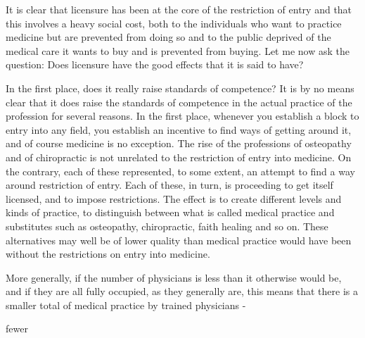 \documentclass[11pt,openany]{book}
\begin{document}
It is clear that licensure has been at the core of the restriction of entry and that this involves a heavy social cost, both to the individuals who want to practice medicine but are prevented from doing so and to the public deprived of the medical care it wants to buy and is prevented from buying. Let me now ask the question: Does licensure have the good effects that it is said to have?

In the first place, does it really raise standards of competence? It is by no means clear that it does raise the standards of competence in the actual practice of the profession for several reasons. In the first place, whenever you establish a block to entry into any field, you establish an incentive to find ways of getting around it, and of course medicine is no exception. The rise of the professions of osteopathy and of chiropractic is not unrelated to the restriction of entry into medicine. On the contrary, each of these represented, to some extent, an attempt to find a way around restriction of entry. Each of these, in turn, is proceeding to get itself licensed, and to impose restrictions. The effect is to create different levels and kinds of practice, to distinguish between what is called medical practice and substitutes such as osteopathy, chiropractic, faith healing and so on. These alternatives may well be of lower quality than medical practice would have been without the restrictions on entry into medicine.

More generally, if the number of physicians is less than it otherwise would be, and if they are all fully occupied, as they generally are, this means that there is a smaller total of medical practice by trained physicians -

fewer
\end{document}
